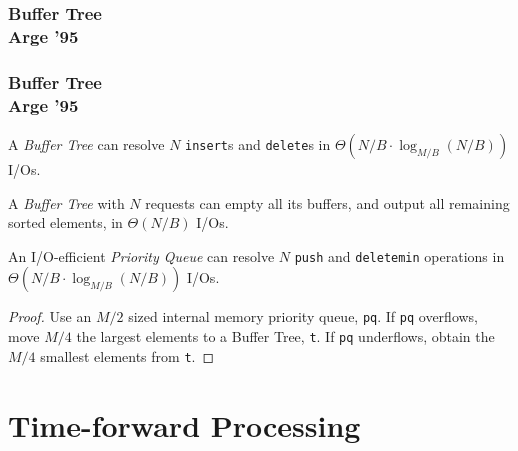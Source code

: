 \documentclass[english, aspectratio=169]{beamer}
\begin{document}
\begin{frame}
  \frametitle{Buffer Tree \\ Arge '95}

  
\end{frame}

\begin{frame}
  \frametitle{Buffer Tree \\ Arge '95}

  \begin{theorem}
    A \emph{Buffer Tree} can resolve $N$ \texttt{insert}s and \texttt{delete}s
    in $\Theta(N/B \cdot \log_{M/B}(N/B))$ I/Os.
  \end{theorem}

  \pause
  \begin{theorem}
    A \emph{Buffer Tree} with $N$ requests can empty all its buffers, and output
    all remaining sorted elements, in $\Theta(N/B)$ I/Os.
  \end{theorem}

  \pause
  \vspace{10pt}

  \begin{corollary}
    An I/O-efficient \emph{Priority Queue} can resolve $N$ \texttt{push} and
    \texttt{deletemin} operations in $\Theta(N/B \cdot \log_{M/B}(N/B))$ I/Os.
  \end{corollary}
  \begin{proof}
    \small

    Use an $M/2$ sized internal memory priority queue, \texttt{pq}. If
    \texttt{pq} overflows, move $M/4$ the largest elements to a Buffer Tree,
    \texttt{t}. If \texttt{pq} underflows, obtain the $M/4$ smallest elements
    from \texttt{t}.
  \end{proof}
\end{frame}

\section{Time-forward Processing}

\blankframe
\end{document}
